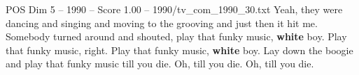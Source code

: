 \begin{textsample}{POS Dim 5 – 1990 – Score 1.00 – 1990/tv\_com\_1990\_30.txt}  \label{ex:f5_pos_024}
Yeah, they were dancing and singing and moving to the grooving and just then it hit me.
Somebody turned around and shouted, play that funky music, \textbf{white} boy.
Play that funky music, right.
Play that funky music, \textbf{white} boy.
Lay down the boogie and play that funky music till you die.
Oh, till you die.
Oh, till you die.

\end{textsample}
